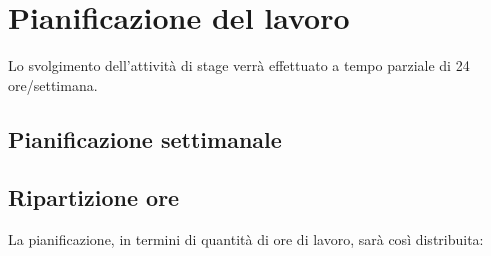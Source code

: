 
\section*{Pianificazione del lavoro}

Lo svolgimento dell'attività di stage verrà effettuato a tempo parziale di 24 ore/settimana.

\subsection*{Pianificazione settimanale}
\prospettoSettimanale

\newpage

\subsection*{Ripartizione ore}

La pianificazione, in termini di quantità di ore di lavoro, sarà così distribuita:

\begin{center}
    
\end{center}

\newpage